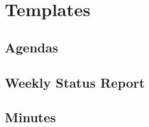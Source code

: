 \chapter{Templates}\label{ch:temp}

\section{Agendas}

\begin{figure}[htb]



\end{figure}

\newpage

\begin{figure}[htb]



\end{figure}

\newpage

\begin{figure}[htb]



\end{figure}

\newpage

\begin{figure}[htb]



\end{figure}

\newpage

\section{Weekly Status Report}

\begin{figure}[htb]



\end{figure}

\newpage

\section{Minutes}

